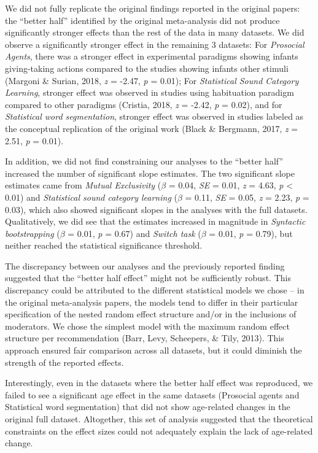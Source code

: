 \documentclass[
  man]{apa6}
\begin{document}
We did not fully replicate the original findings reported in the original papers: the ``better half'' identified by the original meta-analysis did not produce significantly stronger effects than the rest of the data in many datasets. We did observe a significantly stronger effect in the remaining 3 datasets: For \emph{Prosocial Agents}, there was a stronger effect in experimental paradigms showing infants giving-taking actions compared to the studies showing infants other stimuli (Margoni \& Surian, 2018, \emph{z} = -2.47, \emph{p} = 0.01); For \emph{Statistical Sound Category Learning}, stronger effect was observed in studies using habituation paradigm compared to other paradigms (Cristia, 2018, \emph{z} = -2.42, \emph{p} = 0.02), and for \emph{Statistical word segmentation}, stronger effect was observed in studies labeled as the conceptual replication of the original work (Black \& Bergmann, 2017, \emph{z} = 2.51, \emph{p} = 0.01).

In addition, we did not find constraining our analyses to the ``better half'' increased the number of significant slope estimates. The two significant slope estimates came from \emph{Mutual Exclusivity} (\(\beta\) = 0.04, \emph{SE} = 0.01, \emph{z} = 4.63, \emph{p} \textless{} 0.01) and \emph{Statistical sound category learning} (\(\beta\) = 0.11, \emph{SE} = 0.05, \emph{z} = 2.23, \emph{p} = 0.03), which also showed significant slopes in the analyses with the full datasets. Qualitatively, we did see that the estimates increased in magnitude in \emph{Syntactic bootstrapping} (\(\beta\) = 0.01, \emph{p} = 0.67) and \emph{Switch task} (\(\beta\) = 0.01, \emph{p} = 0.79), but neither reached the statistical significance threshold.

The discrepancy between our analyses and the previously reported finding suggested that the ``better half effect'' might not be sufficiently robust. This discrepancy could be attributed to the different statistical models we chose -- in the original meta-analysis papers, the models tend to differ in their particular specification of the nested random effect structure and/or in the inclusions of moderators. We chose the simplest model with the maximum random effect structure per recommendation (Barr, Levy, Scheepers, \& Tily, 2013). This approach ensured fair comparison across all datasets, but it could diminish the strength of the reported effects.

Interestingly, even in the datasets where the better half effect was reproduced, we failed to see a significant age effect in the same datasets (Prosocial agents and Statistical word segmentation) that did not show age-related changes in the original full dataset. Altogether, this set of analysis suggested that the theoretical constraints on the effect sizes could not adequately explain the lack of age-related change.
\end{document}
